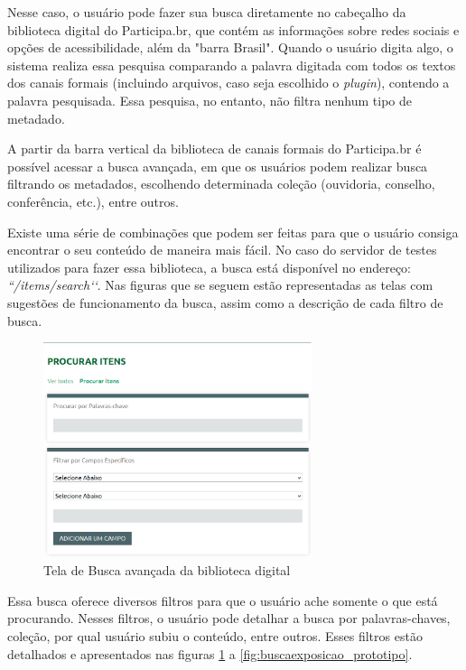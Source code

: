 Nesse caso, o usuário pode fazer sua busca diretamente no cabeçalho da biblioteca digital do Participa.br, que contém as informações sobre redes sociais e opções de acessibilidade, além da "barra Brasil". Quando o usuário digita algo, o sistema realiza essa pesquisa comparando a palavra digitada com todos os textos dos canais formais (incluindo arquivos, caso seja escolhido o \textit{plugin}), contendo a palavra pesquisada. Essa pesquisa, no entanto, não filtra nenhum tipo de metadado. 

A partir da barra vertical da biblioteca de canais formais do Participa.br é possível acessar a busca avançada, em que os usuários podem realizar busca filtrando os metadados, escolhendo determinada coleção (ouvidoria, conselho, conferência, etc.), entre outros.

Existe uma série de combinações que podem ser feitas para que o usuário consiga encontrar o seu conteúdo de maneira mais fácil. No caso do servidor de testes utilizados para fazer essa biblioteca, a busca está disponível no endereço: \textit{``/items/search‘‘}. Nas figuras que se seguem estão representadas as telas com sugestões de funcionamento da busca, assim como a descrição de cada filtro de busca.

\graphicspath{{figuras/prototipo/}}
\begin{figure}[H]
\centering
\includegraphics[width=0.7\textwidth]{tela-busca}
\caption{Tela de Busca avançada da biblioteca digital}
\label{fig:buscaavancada_prototipo}
\end{figure}

Essa busca oferece diversos filtros para que o usuário ache somente o que está procurando. Nesses filtros, o usuário pode detalhar a busca por palavras-chaves, coleção, por qual usuário subiu o conteúdo, entre outros. Esses filtros estão detalhados e apresentados nas figuras \ref{fig:buscaavancada_prototipo} a \ref{fig:buscaexposicao_prototipo}.

